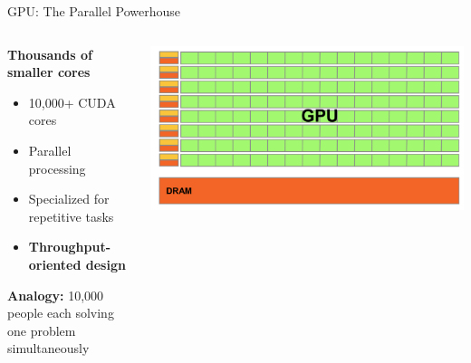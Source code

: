 \documentclass[10pt]{beamer}
\begin{document}
\begin{frame}{GPU: The Parallel Powerhouse}
  \begin{columns}[T]
    \begin{column}{0.5\textwidth}
      \textbf{Thousands of smaller cores}
      \begin{itemize}
        \item 10,000+ CUDA cores
        \item Parallel processing
        \item Specialized for repetitive tasks
        \item \textbf{Throughput-oriented design}
      \end{itemize}
      
      \vspace{1em}
      \textbf{Analogy:} 10,000 people each solving one problem simultaneously
    \end{column}
    \begin{column}{0.5\textwidth}
      \begin{center}
        \includegraphics[width=\textwidth,height=0.6\textheight,keepaspectratio]{images/gpu_arch.png}
      \end{center}
    \end{column}
  \end{columns}
\end{frame}
\end{document}
